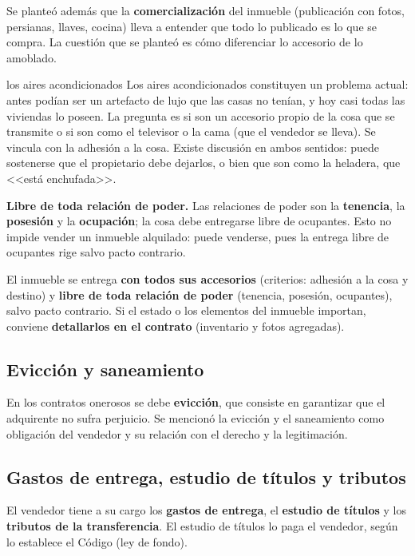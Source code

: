\documentclass[12pt,oneside]{book}
\begin{document}
Se planteó además que la \textbf{comercialización} del inmueble (publicación con fotos, persianas, llaves, cocina) lleva a entender que todo lo publicado es lo que se compra. La cuestión que se planteó es cómo diferenciar lo accesorio de lo amoblado.

\begin{example}{los aires acondicionados}
Los aires acondicionados constituyen un problema actual: antes podían ser un artefacto de lujo que las casas no tenían, y hoy casi todas las viviendas lo poseen. La pregunta es si son un accesorio propio de la cosa que se transmite o si son como el televisor o la cama (que el vendedor se lleva). Se vincula con la adhesión a la cosa. Existe discusión en ambos sentidos: puede sostenerse que el propietario debe dejarlos, o bien que son como la heladera, que <<está enchufada>>.
\end{example}

\textbf{Libre de toda relación de poder.} Las relaciones de poder son la \textbf{tenencia}, la \textbf{posesión} y la \textbf{ocupación}; la cosa debe entregarse libre de ocupantes. Esto no impide vender un inmueble alquilado: puede venderse, pues la entrega libre de ocupantes rige salvo pacto contrario.

\begin{important}
El inmueble se entrega \textbf{con todos sus accesorios} (criterios: adhesión a la cosa y destino) y \textbf{libre de toda relación de poder} (tenencia, posesión, ocupantes), salvo pacto contrario. Si el estado o los elementos del inmueble importan, conviene \textbf{detallarlos en el contrato} (inventario y fotos agregadas).
\end{important}

\subsection{Evicción y saneamiento}

En los contratos onerosos se debe \textbf{evicción}, que consiste en garantizar que el adquirente no sufra perjuicio. Se mencionó la evicción y el saneamiento como obligación del vendedor y su relación con el derecho y la legitimación.

\subsection{Gastos de entrega, estudio de títulos y tributos}

El vendedor tiene a su cargo los \textbf{gastos de entrega}, el \textbf{estudio de títulos} y los \textbf{tributos de la transferencia}. El estudio de títulos lo paga el vendedor, según lo establece el Código (ley de fondo).
\end{document}
